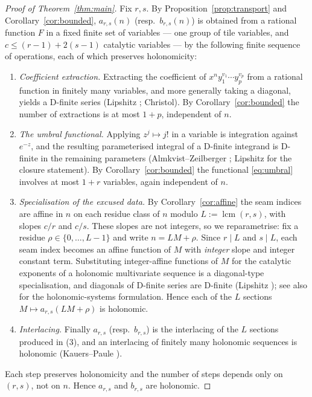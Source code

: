 \documentclass[11pt]{article}
\theoremstyle{definition}
\newcommand{\ars}{a_{r,s}}
\newcommand{\brs}{b_{r,s}}
\begin{document}
\begin{proof}[Proof of Theorem~\ref{thm:main}]
Fix $r,s$. By Proposition~\ref{prop:transport} and
Corollary~\ref{cor:bounded}, $\ars(n)$ (resp.\ $\brs(n)$) is obtained from a
rational function $F$ in a fixed finite set of variables --- one group of tile
variables, and $c\le (r-1)+2(s-1)$ catalytic variables --- by the following
finite sequence of operations, each of which preserves holonomicity:
\begin{enumerate}
\item[(1)] \emph{Coefficient extraction.} Extracting the coefficient of
$x^{n}y_1^{v_1}\cdots y_p^{v_p}$ from a rational function in finitely many
variables, and more generally taking a diagonal, yields a D-finite series
(Lipshitz \cite{Lipshitz}; Christol). By Corollary~\ref{cor:bounded} the number
of extractions is at most $1+p$, independent of $n$.
\item[(2)] \emph{The umbral functional.} Applying $z^{j}\mapsto j!$ in a
variable is integration against $e^{-z}$, and the resulting parameterised
integral of a D-finite integrand is D-finite in the remaining parameters
(Almkvist--Zeilberger \cite{AZ}; Lipshitz \cite{Lipshitz} for the closure
statement). By Corollary~\ref{cor:bounded} the functional \eqref{eq:umbral}
involves at most $1+r$ variables, again independent of $n$.
\item[(3)] \emph{Specialisation of the excused data.} By
Corollary~\ref{cor:affine} the seam indices are affine in $n$ on each residue
class of $n$ modulo $L:=\operatorname{lcm}(r,s)$, with slopes $c/r$ and $c/s$.
These slopes are not integers, so we reparametrise: fix a residue
$\rho\in\{0,\dots,L-1\}$ and write $n=LM+\rho$. Since $r\mid L$ and $s\mid L$,
each seam index becomes an affine function of $M$ with \emph{integer} slope and
integer constant term. Substituting integer-affine functions of $M$ for the
catalytic exponents of a holonomic multivariate sequence is a diagonal-type
specialisation, and diagonals of D-finite series are D-finite
(Lipshitz \cite{LipshitzDiag}); see also \cite[\S 2]{Zeilberger} for the
holonomic-systems formulation. Hence each of the $L$ sections
$M\mapsto \ars(LM+\rho)$ is holonomic.
\item[(4)] \emph{Interlacing.} Finally $\ars$ (resp.\ $\brs$) is the
interlacing of the $L$ sections produced in (3), and an interlacing of finitely
many holonomic sequences is holonomic (Kauers--Paule
\cite[Ch.~7]{KauersPaule}).
\end{enumerate}
Each step preserves holonomicity and the number of steps depends only on
$(r,s)$, not on $n$. Hence $\ars$ and $\brs$ are holonomic.
\end{proof}
\end{document}
